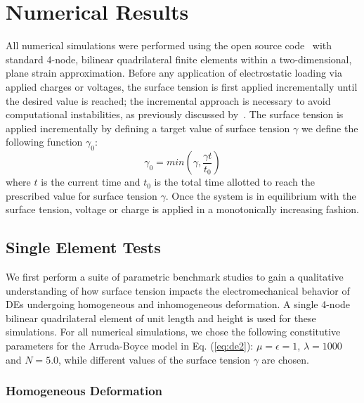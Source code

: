\documentclass[final,authoryear,3p,times,twocolumn]{elsarticle}
\begin{document}
\section{Numerical Results}

All numerical simulations were performed using the open source code~\citet{tahoe} with standard 4-node, bilinear quadrilateral finite elements within a two-dimensional, plane strain approximation.  Before any application of electrostatic loading via applied charges or voltages, the surface tension is first applied incrementally until the desired value is reached; the incremental approach is necessary to avoid computational instabilities, as previously discussed by~\citet{javiliCMAME2010}.  The surface tension is applied incrementally by defining a target value of surface tension $\gamma$ we define the following function $\gamma_{0}$: 
\begin{equation} \gamma_{0}=min\left(\gamma,\frac{\gamma t}{t_0}\right)
\label{eq:gammaramp}
\end{equation}
where $t$ is the current time and $t_0$ is the total time allotted to reach the prescribed value for surface tension $\gamma$.  Once the system is in equilibrium with the surface tension, voltage or charge is applied in a monotonically increasing fashion.

\subsection{Single Element Tests}

We first perform a suite of parametric benchmark studies to gain a qualitative understanding of how surface tension impacts the electromechanical behavior of DEs undergoing homogeneous and inhomogeneous deformation.  A single 4-node bilinear quadrilateral element of unit length and height is used for these simulations.  For all numerical simulations, we chose the following constitutive parameters for the Arruda-Boyce model in Eq. (\ref{eq:de2}):  $\mu=\epsilon=1$, $\lambda=1000$ and $N=5.0$, while different values of the surface tension $\gamma$ are chosen.    

\subsubsection{Homogeneous Deformation}
\end{document}
